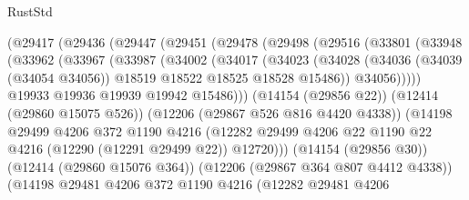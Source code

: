 \begin{lexlean}{RustStd}
\begin{coremodule}
{\begin{coremodule}
{{{{{{{{{{{{{{{{{{{{{{{{{{{{{{{{{{{{{{{{{{{{{{{{{{                (@29417
                  (@29436
                    (@29447
                      (@29451
                        (@29478
                          (@29498
                            (@29516
                              (@33801
                                (@33948
                                  (@33962
                                    (@33967
                                      (@33987
                                        (@34002
                                          (@34017
                                            (@34023
                                              (@34028
                                                (@34036
                                                  (@34039 (@34054 @34056))
                                                  @18519
                                                  @18522
                                                  @18525
                                                  @18528
                                                  @15486))
                                              @34056)))))
                                    @19933
                                    @19936
                                    @19939
                                    @19942
                                    @15486)))
                              (@14154 (@29856 @22))
                              (@12414 (@29860 @15075 @526))
                              (@12206 (@29867 @526 @816 @4420 @4338))
                              (@14198
                                @29499
                                @4206
                                @372
                                @1190
                                @4216
                                (@12282
                                  @29499
                                  @4206
                                  @22
                                  @1190
                                  @22
                                  @4216
                                  (@12290 (@12291 @29499 @22))
                                  @12720)))
                            (@14154 (@29856 @30))
                            (@12414 (@29860 @15076 @364))
                            (@12206 (@29867 @364 @807 @4412 @4338))
                            (@14198
                              @29481
                              @4206
                              @372
                              @1190
                              @4216
                              (@12282
                                @29481
                                @4206
}}}}}}}}}}}}}}}}}}}}}}}}}}}}}}}}}}}}}}}}}}}}}}}}}}
\end{coremodule}}
\end{coremodule}
\end{lexlean}
